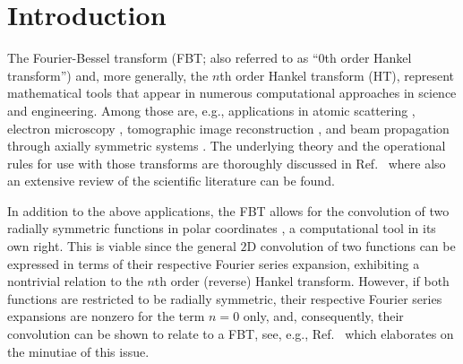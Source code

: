 \documentclass[12pt]{iopart}
\begin{document}
\section{Introduction}

The Fourier-Bessel transform (FBT; also referred to as ``$0$th order Hankel
transform'') and, more generally, the $n$th order Hankel transform (HT),
represent mathematical tools that appear in numerous computational approaches
in science and engineering.  Among those are, e.g., applications in atomic
scattering \cite{Talman:1978}, electron microscopy \cite{FiskJohnson:1987},
tomographic image reconstruction \cite{Higgins:1988}, and beam propagation
through axially symmetric systems \cite{GuizarSicairos:2004}.  
The underlying theory and the operational rules for use with those transforms
are thoroughly discussed in Ref.~\cite{Baddour:2015} where also an extensive
review of the scientific literature can be found.

In addition to the above applications, the FBT allows for the convolution of
two radially symmetric functions in polar coordinates \cite{Baddour:2009}, a
computational tool in its own right.  This is viable since the general $2$D
convolution of two functions can be expressed in terms of their respective
Fourier series expansion, exhibiting a nontrivial relation to the $n$th order
(reverse) Hankel transform. 
However, if both functions are restricted to be radially symmetric, their
respective Fourier series expansions are nonzero for the term $n=0$ only, and,
consequently, their convolution can be shown to relate to a FBT, see, e.g., 
Ref.~\cite{Baddour:2009} which elaborates  on the minutiae of this issue.  
\end{document}
